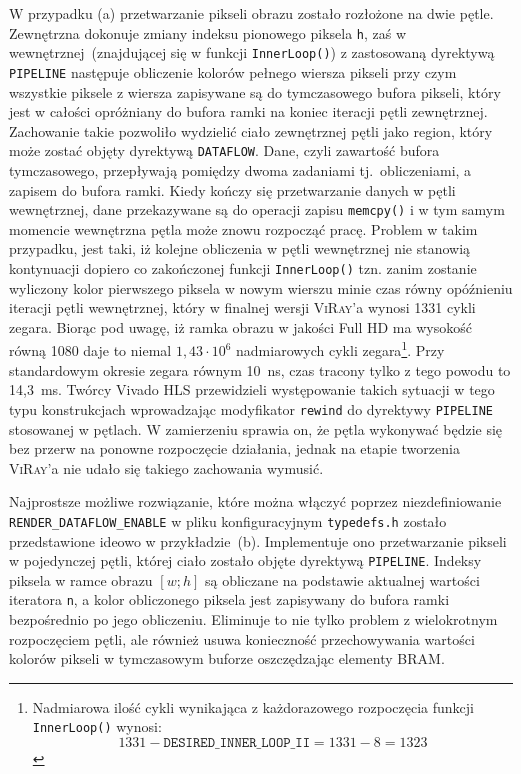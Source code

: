 \begin{enumerate}
\begin{enumerate}
\end{enumerate}
W przypadku (a) przetwarzanie pikseli obrazu zostało rozłożone na dwie pętle. Zewnętrzna dokonuje zmiany indeksu pionowego piksela \texttt{h}, zaś w wewnętrznej~(znajdującej się w funkcji \texttt{InnerLoop()}) z zastosowaną dyrektywą \texttt{PIPELINE} następuje obliczenie kolorów pełnego wiersza pikseli przy czym wszystkie piksele z wiersza zapisywane są do tymczasowego bufora pikseli, który jest w całości opróżniany do bufora ramki na koniec iteracji pętli zewnętrznej. Zachowanie takie pozwoliło wydzielić ciało zewnętrznej pętli jako region, który może zostać objęty dyrektywą \texttt{DATAFLOW}. Dane, czyli zawartość bufora tymczasowego, przepływają pomiędzy dwoma zadaniami tj.~obliczeniami, a zapisem do bufora ramki. Kiedy kończy się przetwarzanie danych w pętli wewnętrznej, dane przekazywane są do operacji zapisu \texttt{memcpy()} i w tym samym momencie wewnętrzna pętla może znowu rozpocząć pracę. Problem w takim przypadku, jest taki, iż kolejne obliczenia w pętli wewnętrznej nie stanowią kontynuacji dopiero co zakończonej funkcji \texttt{InnerLoop()} tzn. zanim zostanie wyliczony kolor pierwszego piksela w nowym wierszu minie czas równy opóźnieniu iteracji pętli wewnętrznej, który w finalnej wersji \textsc{ViRay}'a wynosi {\color{red}1331} cykli zegara. Biorąc pod uwagę, iż ramka obrazu w jakości Full HD ma wysokość równą 1080 daje to niemal $1,43\cdot 10^6$ nadmiarowych cykli zegara\footnote{Nadmiarowa ilość cykli wynikająca z każdorazowego rozpoczęcia funkcji \texttt{InnerLoop()} wynosi: 
\begin{equation}
1331 - \mathtt{DESIRED\_INNER\_LOOP\_II} = 1331 - 8 = 1323
\end{equation}
}. Przy standardowym okresie zegara równym 10~ns, czas tracony tylko z tego powodu to 14,3~ms. Twórcy Vivado HLS przewidzieli występowanie takich sytuacji w tego typu konstrukcjach wprowadzając modyfikator \texttt{rewind} do dyrektywy \texttt{PIPELINE} stosowanej w pętlach. W zamierzeniu sprawia on, że pętla wykonywać będzie się bez przerw na ponowne rozpoczęcie działania, jednak na etapie tworzenia \textsc{ViRay}'a nie udało się takiego zachowania wymusić.

Najprostsze możliwe rozwiązanie, które można włączyć poprzez niezdefiniowanie \texttt{RENDER\_DATAFLOW\_ENABLE} w pliku konfiguracyjnym \texttt{typedefs.h} zostało przedstawione ideowo w przykładzie~(b). Implementuje ono przetwarzanie pikseli w pojedynczej pętli, której ciało zostało objęte dyrektywą \texttt{PIPELINE}. Indeksy piksela w ramce obrazu $[w;h]$ są obliczane na podstawie aktualnej wartości iteratora \texttt{n}, a kolor obliczonego piksela jest zapisywany do bufora ramki bezpośrednio po jego obliczeniu. Eliminuje to nie tylko problem z wielokrotnym rozpoczęciem pętli, ale również usuwa konieczność przechowywania wartości kolorów pikseli w tymczasowym buforze oszczędzając elementy BRAM. 


\end{enumerate}

